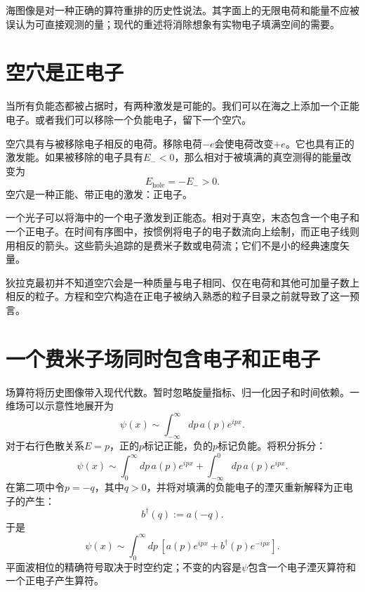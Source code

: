海图像是对一种正确的算符重排的历史性说法。其字面上的无限电荷和能量不应被误认为可直接观测的量；现代的重述将消除想象有实物电子填满空间的需要。

\section{空穴是正电子}

当所有负能态都被占据时，有两种激发是可能的。我们可以在海之上添加一个正能电子。或者我们可以移除一个负能电子，留下一个空穴。

空穴具有与被移除电子相反的电荷。移除电荷\(-e\)会使电荷改变\(+e\)。它也具有正的激发能。如果被移除的电子具有\(E_-<0\)，那么相对于被填满的真空测得的能量改变为
\begin{equation}
E_{\mathrm{hole}}=-E_->0.
\end{equation}
空穴是一种正能、带正电的激发：正电子。

一个光子可以将海中的一个电子激发到正能态。相对于真空，末态包含一个电子和一个正电子。在时间有序图中，按惯例将电子的电子数流向上绘制，而正电子线则用相反的箭头。这些箭头追踪的是费米子数或电荷流；它们不是小的经典速度矢量。

\begin{classroomqa}
\end{classroomqa}

狄拉克最初并不知道空穴会是一种质量与电子相同、仅在电荷和其他可加量子数上相反的粒子。方程和空穴构造在正电子被纳入熟悉的粒子目录之前就导致了这一预言。

\section{一个费米子场同时包含电子和正电子}

场算符将历史图像带入现代代数。暂时忽略旋量指标、归一化因子和时间依赖。一维场可以示意性地展开为
\begin{equation}
\psi(x)
\sim
\int_{-\infty}^{\infty}dp\,a(p)e^{ipx}.
\label{eq:l10-full-field-integral}
\end{equation}
对于右行色散关系\(E=p\)，正的\(p\)标记正能，负的\(p\)标记负能。将积分拆分：
\begin{equation}
\psi(x)
\sim
\int_0^\infty dp\,a(p)e^{ipx}
+
\int_{-\infty}^0 dp\,a(p)e^{ipx}.
\end{equation}
在第二项中令\(p=-q\)，其中\(q>0\)，并将对填满的负能电子的湮灭重新解释为正电子的产生：
\begin{equation}
b^\dagger(q):=a(-q).
\end{equation}
于是
\begin{equation}
\psi(x)
\sim
\int_0^\infty dp\,
\left[
a(p)e^{ipx}
+
b^\dagger(p)e^{-ipx}
\right].
\label{eq:l10-electron-positron-split}
\end{equation}
平面波相位的精确符号取决于时空约定；不变的内容是\(\psi\)包含一个电子湮灭算符和一个正电子产生算符。

